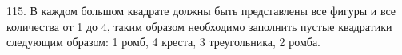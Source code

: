 115. В каждом большом квадрате должны быть представлены все фигуры и все количества от 1 до 4, таким образом необходимо заполнить пустые квадратики следующим образом: 1 ромб, 4 креста, 3 треугольника, 2 ромба.\\
